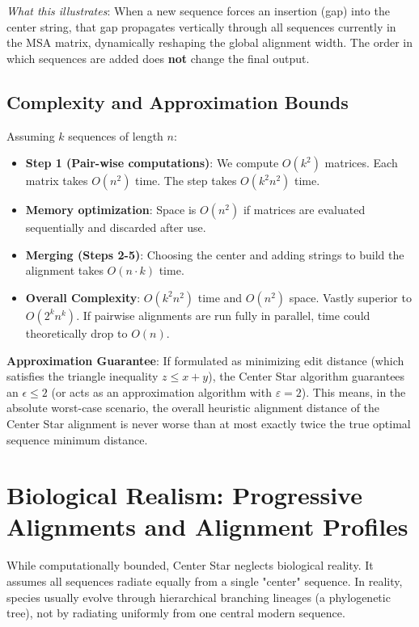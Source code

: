 \textit{What this illustrates}: When a new sequence forces an insertion (gap) into the center string, that gap propagates vertically through all sequences currently in the MSA matrix, dynamically reshaping the global alignment width. The order in which sequences are added does \textbf{not} change the final output.

\subsection{Complexity and Approximation Bounds}

Assuming $k$ sequences of length $n$:
\begin{itemize}
    \item \textbf{Step 1 (Pair-wise computations)}: We compute $O(k^2)$ matrices. Each matrix takes $O(n^2)$ time. The step takes $O(k^2 n^2)$ time.
    \item \textbf{Memory optimization}: Space is $O(n^2)$ if matrices are evaluated sequentially and discarded after use.
    \item \textbf{Merging (Steps 2-5)}: Choosing the center and adding strings to build the alignment takes $O(n \cdot k)$ time.
    \item \textbf{Overall Complexity}: $O(k^2 n^2)$ time and $O(n^2)$ space. Vastly superior to $O(2^k n^k)$. If pairwise alignments are run fully in parallel, time could theoretically drop to $O(n)$.
\end{itemize}

\sta \textbf{Approximation Guarantee}: If formulated as minimizing edit distance (which satisfies the triangle inequality $z \le x+y$), the Center Star algorithm guarantees an $\epsilon \le 2$ (or acts as an approximation algorithm with $\varepsilon = 2$). This means, in the absolute worst-case scenario, the overall heuristic alignment distance of the Center Star alignment is never worse than at most exactly twice the true optimal sequence minimum distance.

\section{Biological Realism: Progressive Alignments and Alignment Profiles}

While computationally bounded, Center Star neglects biological reality. It assumes all sequences radiate equally from a single "center" sequence. In reality, species usually evolve through hierarchical branching lineages (a phylogenetic tree), not by radiating uniformly from one central modern sequence.

